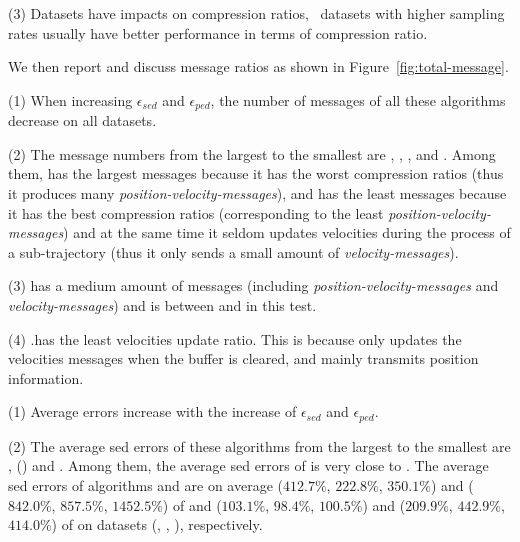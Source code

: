 {\ni (3) Datasets have impacts on compression ratios, \ie~datasets with higher sampling rates usually have better performance in terms of compression ratio.
	


 We then report and discuss message ratios as shown in Figure~\ref{fig:total-message}.


\ni (1) When increasing $\epsilon_{sed}$ and $\epsilon_{ped}$, the number of messages of all these algorithms decrease on all datasets.

\ni (2) The message numbers from the largest to the smallest are \ldrh, \grts, \citt, \bitt and \sitt. Among them, \ldrh has the largest messages because it has the worst compression ratios (thus it produces many \emph{position-velocity-messages}), and \sitt has the least messages because it has the best compression ratios (corresponding to the least \emph{position-velocity-messages}) and at the same time it seldom updates velocities during the process of a sub-trajectory (thus it only sends a small amount of \emph{velocity-messages}).


\ni (3) \citt has a medium amount of messages (including \emph{position-velocity-messages} and \emph{velocity-messages}) and \bitt is between \citt and \sitt in this test.


\ni (4) \todo.\grts has the least velocities update ratio. This is because \grts only updates the velocities messages when the buffer is cleared, and mainly transmits position information.





\ni (1) Average errors increase with the increase of $\epsilon_{sed}$ and $\epsilon_{ped}$.

\ni (2) The average sed errors of these algorithms from the largest to the smallest are \sitt, \grts (\citt) and \ldrh. Among them, the average sed errors of \citt is very close to \grts.
The average sed errors of algorithms \citt and \sitt are on average
($412.7\%$, $222.8\%$, $350.1\%$)
and ($842.0\%$, $857.5\%$, $1452.5\%$)
of \ldrh and ($103.1\%$, $98.4\%$, $100.5\%$) and
($209.9\%$, $442.9\%$, $414.0\%$)
of \grts on datasets (\mopsi, \sercar, \geolife), respectively.

}
